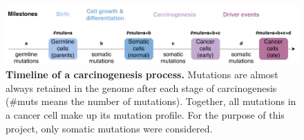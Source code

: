 \begin{figure}[ht!]
    \centering
    \includegraphics[scale=0.78]{graphics/drivers_demo.pdf}
    \caption{\textbf{Timeline of a carcinogenesis process.} Mutations are almost always retained in the genome after each stage of carcinogenesis (\#muts means the number of mutations). Together, all mutations in a cancer cell make up its mutation profile. For the purpose of this project, only somatic mutations were considered.}
    \label{fig:drivers_demo}
\end{figure}

